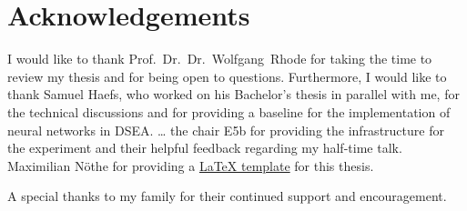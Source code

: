 \chapter*{Acknowledgements}

I would like to thank Prof.~Dr.~Dr.~Wolfgang~Rhode for taking the time to
review my thesis
and for being open to questions.
Furthermore,
I would like to thank Samuel Haefs,
who worked on his Bachelor's thesis in parallel with me,
for the technical discussions
and for providing a baseline for the implementation of neural networks in DSEA.
… the chair E5b for providing the infrastructure for the experiment
and their helpful feedback regarding my half-time talk.
Maximilian Nöthe for providing a \href{https://github.com/maxnoe/tudothesis}{\LaTeX{} template} for this thesis.


A special thanks to my family for their continued support and encouragement.
